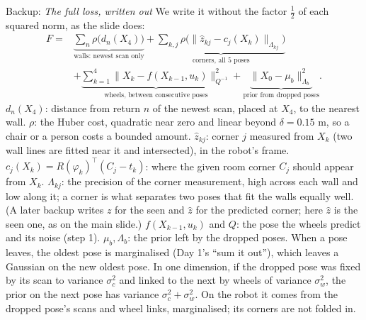 \documentclass[11pt]{article}
\newcommand{\norm}[2]{\lVert #1\rVert^2_{#2}}
\begin{document}
\begin{backupbox}{Backup: \emph{The full loss, written out}}
We write it without the factor $\tfrac12$ of each squared norm, as the slide does:
\begin{align*}
F={}&\underbrace{\sum_n\rho\big(d_n(X_4)\big)}_{\text{walls: newest scan only}}
+\underbrace{\sum_{k,j}\rho\big(\lVert\hat z_{kj}-c_j(X_k)\rVert_{\Lambda_{kj}}\big)}_{\text{corners, all 5 poses}}\\
&+\underbrace{\sum_{k=1}^{4}\norm{X_k-f(X_{k-1},u_k)}{Q^{-1}}}_{\text{wheels, between consecutive poses}}
+\underbrace{\norm{X_0-\mu_b}{\Lambda_b}}_{\text{prior from dropped poses}} .
\end{align*}
$d_n(X_4)$: distance from return $n$ of the newest scan, placed at $X_4$, to the nearest wall. $\rho$: the Huber cost, quadratic near zero and linear beyond $\delta=0.15$ m, so a chair or a person costs a bounded amount. $\hat z_{kj}$: corner $j$ measured from $X_k$ (two wall lines are fitted near it and intersected), in the robot's frame. $c_j(X_k)=R(\varphi_k)^\top(C_j-t_k)$: where the given room corner $C_j$ should appear from $X_k$. $\Lambda_{kj}$: the precision of the corner measurement, high across each wall and low along it; a corner is what separates two poses that fit the walls equally well. (A later backup writes $z$ for the seen and $\hat z$ for the predicted corner; here $\hat z$ is the seen one, as on the main slide.) $f(X_{k-1},u_k)$ and $Q$: the pose the wheels predict and its noise (step 1). $\mu_b,\Lambda_b$: the prior left by the dropped poses. When a pose leaves, the oldest pose is marginalised (Day 1's ``sum it out''), which leaves a Gaussian on the new oldest pose. In one dimension, if the dropped pose was fixed by its scan to variance $\sigma_c^2$ and linked to the next by wheels of variance $\sigma_w^2$, the prior on the next pose has variance $\sigma_c^2+\sigma_w^2$. On the robot it comes from the dropped pose's scans and wheel links, marginalised; its corners are not folded in.
\end{backupbox}
\end{document}

